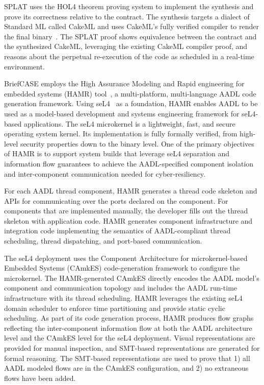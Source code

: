 SPLAT uses the HOL4 theorem proving system to implement the synthesis and prove its correctness relative to the contract. The synthesis targets a dialect of Standard ML called CakeML and uses CakeML’s fully verified compiler to render the final binary~\cite{cakeml}. 
The SPLAT proof shows equivalence between the contract and the synthesized CakeML, leveraging the existing CakeML compiler proof, and reasons about the perpetual re-execution of the code as scheduled in a real-time environment.

BriefCASE employs the High Assurance Modeling and Rapid engineering for embedded systems (HAMR) tool~\cite{hamr}, a multi-platform, multi-language AADL code generation framework. 
Using seL4~\cite{sel4-sosp09} as a foundation, HAMR enables AADL to be used as a model-based development and systems engineering framework for seL4-based applications. 
The seL4 microkernel is a lightweight, fast, and secure operating system kernel. Its implementation is fully formally verified, from high-level security properties down to the binary level.
One of the primary objectives of HAMR is to support system builds that leverage seL4 separation and information flow guarantees to achieve the AADL-specified component isolation and inter-component communication needed for cyber-resiliency. 

For each AADL thread component, HAMR generates a thread code skeleton and APIs for communicating over the ports declared on the component. For components that are implemented manually, the developer fills out the thread skeleton with application code. 
HAMR generates component infrastructure and integration code implementing the semantics of AADL-compliant thread scheduling, thread dispatching, and port-based communication. 

The seL4 deployment uses the Component Architecture for microkernel-based Embedded Systems (CAmkES) code-generation framework to configure the microkernel. The HAMR-generated CAmkES directly encodes the AADL model’s component and communication topology and includes the AADL run-time infrastructure with its thread scheduling. HAMR leverages the existing seL4 domain scheduler to enforce time partitioning and provide static cyclic scheduling. 
As part of its code generation process, HAMR produces flow graphs reflecting the inter-component information flow at both the AADL architecture level and the CAmkES level for the seL4 deployment. Visual representations are provided for manual inspection, and SMT-based representations are generated for formal reasoning. The SMT-based representations are used to prove that 1) all AADL modeled flows are in the CAmkES configuration, and 2) no extraneous flows have been added. 


